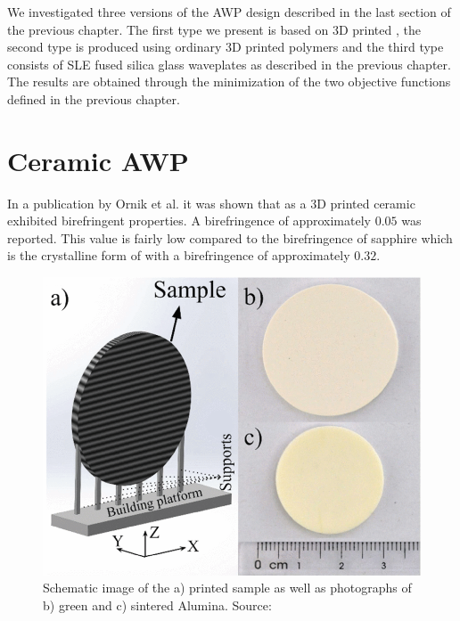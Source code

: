 We investigated three versions of the AWP design described in the last section of the previous chapter. The first type we present is based on 3D printed , the second type is produced using ordinary 3D printed polymers and the third type consists of SLE fused silica glass waveplates as described in the previous chapter. The results are obtained through the minimization of the two objective functions defined in the previous chapter.


\section{Ceramic AWP}
In a publication by Ornik et al. it was shown that  as a 3D printed ceramic exhibited birefringent properties. A birefringence of approximately $0.05$ was reported. This value is fairly low compared to the birefringence of sapphire which is the crystalline form of  with a birefringence of approximately $0.32$. 

\begin{figure}[ht]
    \centering
    \includegraphics[scale=0.4]{images/5_chapter05/ornikabclarge.png}
    \caption{Schematic image of the a) printed sample as well as photographs of b) green and c) sintered Alumina. Source: \cite{Ornik2021}}
    \label{fig:ornik1abc}
\end{figure}

